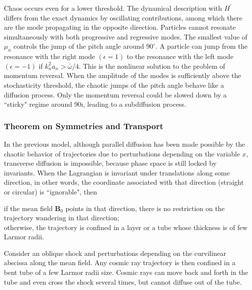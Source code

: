 \documentclass[12pt,a4paper]{article}
\renewcommand{\vec}[1]{\boldsymbol{#1}}
\begin{document}
Chaos occurs even for a lower threshold. The dynamical description with $H^\prime$ differs from the exact dynamics by oscillating contributions, among which there are the mode propagating in the opposite direction. Particles cannot resonate simultaneously with both progressive and regressive modes. The smallest value of $\mu_n$ controls the jump of the pitch angle around $90^\circ$. A particle can jump from the resonance with the right mode $(\epsilon = 1)$ to the resonance with the left mode $(\epsilon = -1)$ if $k_n^2 a_n > \bar{\omega}/4$. This is the nonlinear solution to the problem of momentum reversal. When the amplitude of the modes is sufficiently above the stochasticity threshold, the chaotic jumps of the pitch angle behave like a diffusion process. Only the momentum reversal could be slowed down by a ``sticky" regime around 90ı, leading to a subdiffusion process.


\subsubsection{Theorem on Symmetries and Transport}
In the previous model, although parallel diffusion has been made possible by the chaotic behavior of trajectories due to perturbations depending on the variable $x$, transverse diffusion is impossible, because phase space is still locked by invariants. When the Lagrangian is invariant under translations along some direction, in other words, the coordinate associated with that direction (straight or circular) is ``ignorable", then

if the mean field $\vec{B}_0$ points in that direction, there is no restriction on the trajectory wandering in that direction; \\

otherwise, the trajectory is confined in a layer or a tube whose thickness is of few Larmor radii.

Consider an oblique shock and perturbations depending on the curvilinear abscissa along the mean field. Any cosmic ray trajectory is then confined in a bent tube of a few Larmor radii size. Cosmic rays can move back and forth in the tube and even cross the shock several times, but cannot diffuse out of the tube.
\end{document}
